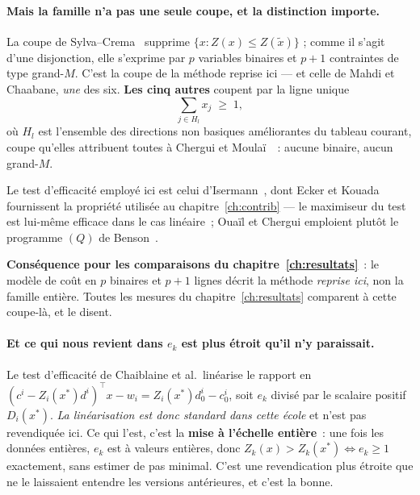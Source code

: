 \documentclass[12pt,a4paper]{report}
\newcommand{\Z}{Z}
\theoremstyle{plain}
\theoremstyle{definition}
\begin{document}
\paragraph{Mais la famille n'a pas une seule coupe, et la distinction
importe.}
La coupe de Sylva--Crema~\cite{sylvacrema} supprime
$\{x : \Z(x) \leqslant \Z(\tilde x)\}$ ; comme il s'agit d'une disjonction,
elle s'exprime par $p$ variables binaires et $p+1$ contraintes de type
grand-$M$.  C'est la coupe de la méthode reprise ici --- et celle de Mahdi
et Chaabane, \emph{une} des six.  \textbf{Les cinq autres} coupent par la
ligne unique
\[
  \sum_{j \in H_l} x_j \;\geqslant\; 1 ,
\]
où $H_l$ est l'ensemble des directions non basiques améliorantes du tableau
courant, coupe qu'elles attribuent toutes à Chergui et
Moula\"i~\cite{cherguimoulai2008}~: aucune binaire, aucun grand-$M$.

Le test d'efficacité employé ici est celui d'Isermann~\cite{isermann1974},
dont Ecker et Kouada~\cite{eckerkouada} fournissent la propriété utilisée au
chapitre~\ref{ch:contrib} --- le maximiseur du test est lui-même efficace
dans le cas linéaire~; Oua\"il et Chergui emploient plutôt le programme
$(Q)$ de Benson~\cite{benson1978}.

\textbf{Conséquence pour les comparaisons du chapitre~\ref{ch:resultats}}~:
le modèle de coût en $p$ binaires et $p+1$ lignes décrit la méthode
\emph{reprise ici}, non la famille entière.  Toutes les mesures du
chapitre~\ref{ch:resultats} comparent à cette coupe-là, et le disent.

\paragraph{Et ce qui nous revient dans $e_k$ est plus étroit qu'il n'y
paraissait.}
Le test d'efficacité de Chaiblaine et al.\ linéarise le rapport en
$(c^i - Z_i(x^*)d^i)^{\top}x - w_i = Z_i(x^*)d^i_0 - c^i_0$, soit
$e_k$ divisé par le scalaire positif $D_i(x^*)$.  \emph{La linéarisation est
donc standard dans cette école} et n'est pas revendiquée ici.  Ce qui l'est,
c'est la \textbf{mise à l'échelle entière}~: une fois les données entières,
$e_k$ est à valeurs entières, donc
$Z_k(x) > Z_k(x^*) \iff e_k \geqslant 1$ exactement, sans estimer de pas
minimal.  C'est une revendication plus étroite que ne le laissaient entendre
les versions antérieures, et c'est la bonne.
\end{document}
